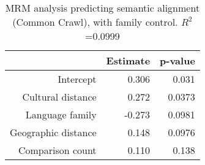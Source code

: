 \begin{table}[ht]
\centering
\begin{tabular}{rrr}
  \hline
 & Estimate & p-value \\ 
  \hline
Intercept & 0.306 & 0.031 \\ 
  Cultural distance & 0.272 & 0.0373 \\ 
  Language family & -0.273 & 0.0981 \\ 
  Geographic distance & 0.148 & 0.0976 \\ 
  Comparison count & 0.110 & 0.138 \\ 
   \hline
\end{tabular}
\caption{MRM analysis predicting semantic alignment (Common Crawl), with family control. $R^2$=0.0999} 
\end{table}
